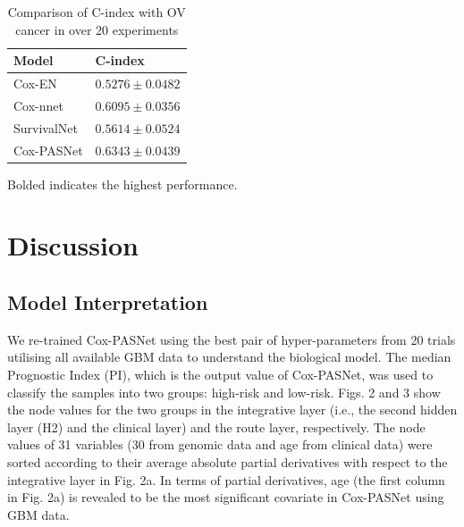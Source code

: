 \documentclass[10pt,twocolumn,twoside,lineno]{gsajnl}
\begin{document}
\begin{table}[H]
	
	\caption{Comparison of C-index with OV cancer in over 20 experiments}
	\begin{tableminipage}{0.482\textwidth}
		\begin{tabularx}{\textwidth}{@{}XX@{}}
			\hline
			{\bf Model} & {\bf C-index}\\
			\hline
			Cox-EN & $ 0.5276 \pm 0.0482 $ \\
			Cox-nnet & $ 0.6095 \pm 0.0356 $ \\
			SurvivalNet & $ 0.5614 \pm 0.0524 $ \\
			Cox-PASNet & $ \mathbf{0.6343 \pm 0.0439} $ \\
			\hline
		\end{tabularx}
		\label{tab:shape-functions}
	\end{tableminipage}
	\footnotesize{Bolded indicates the highest performance.}
\end{table}



\section{Discussion}
\subsection{Model Interpretation}


We re-trained Cox-PASNet using the best pair of hyper-parameters from 20 trials utilising all available GBM data to understand the biological model.
The median Prognostic Index (PI), which is the output value of Cox-PASNet, was used to classify the samples into two groups: high-risk and low-risk.
Figs. 2 and 3 show the node values for the two groups in the integrative layer (i.e., the second hidden layer (H2) and the clinical layer) and the route layer, respectively.
The node values of 31 variables (30 from genomic data and age from clinical data) were sorted according to their average absolute partial derivatives with respect to the integrative layer in Fig. 2a.
In terms of partial derivatives, age (the first column in Fig. 2a) is revealed to be the most significant covariate in Cox-PASNet using GBM data.
\end{document}
